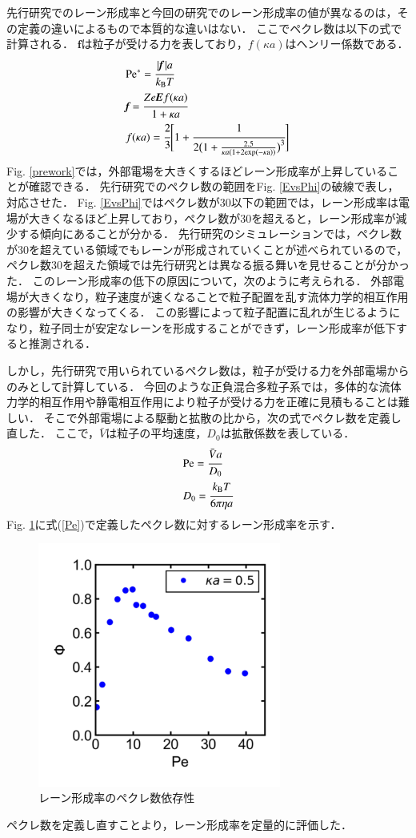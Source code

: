 先行研究でのレーン形成率と今回の研究でのレーン形成率の値が異なるのは，その定義の違いによるもので本質的な違いはない．
ここでペクレ数は以下の式で計算される．
$\boldsymbol{f}$は粒子が受ける力を表しており，$f(\kappa a)$はヘンリー係数である\cite{Henry}．
\begin{eqnarray}
	& \textrm{Pe}^* = \cfrac{|\textit{\textbf{f}}\,| a}{k_{\rm{B}} T}\\
	& \textit{\textbf{f}} = \cfrac{Ze\textit{\textbf{E}}f(\kappa a)}{1 + \kappa a}\\
	& f(\kappa a) = \cfrac{2}{3} \Biggl[1 + \cfrac{1}{2 \bigl(1 + \frac{2.5}{\kappa a (1 + 2 \rm{exp}(-\kappa a))}\bigl)^3}\Biggl]
\end{eqnarray}
Fig. \ref{prework}では，外部電場を大きくするほどレーン形成率が上昇していることが確認できる．
先行研究でのペクレ数の範囲をFig. \ref{EvsPhi}の破線で表し，対応させた．
Fig. \ref{EvsPhi}ではペクレ数が30以下の範囲では，レーン形成率は電場が大きくなるほど上昇しており，ペクレ数が30を超えると，レーン形成率が減少する傾向にあることが分かる．
先行研究のシミュレーションでは，ペクレ数が30を超えている領域でもレーンが形成されていくことが述べられているので，ペクレ数30を超えた領域では先行研究とは異なる振る舞いを見せることが分かった．
このレーン形成率の低下の原因について，次のように考えられる．
外部電場が大きくなり，粒子速度が速くなることで粒子配置を乱す流体力学的相互作用の影響が大きくなってくる．
この影響によって粒子配置に乱れが生じるようになり，粒子同士が安定なレーンを形成することができず，レーン形成率が低下すると推測される．

しかし，先行研究で用いられているペクレ数は，粒子が受ける力を外部電場からのみとして計算している．
今回のような正負混合多粒子系では，多体的な流体力学的相互作用や静電相互作用により粒子が受ける力を正確に見積もることは難しい．
そこで外部電場による駆動と拡散の比から，次の式でペクレ数を定義し直した．
ここで，$\bar{V}$は粒子の平均速度，$D_0$は拡散係数を表している．
\begin{eqnarray}
	& \textrm{Pe} = \cfrac{\bar{V}a}{D_0}  \label{Pe}\\
	& D_0 = \cfrac{k_{\rm{B}}T}{6 \pi \eta a}
\end{eqnarray}
%
Fig. \ref{PevsPhi}に式(\ref{Pe})で定義したペクレ数に対するレーン形成率を示す．

%
\begin{figure}[H]
\centering
\includegraphics[width=8.0cm]{figures/PevsPhi.pdf}
\caption{レーン形成率のペクレ数依存性}
\label{PevsPhi}
\end{figure}
\noindent
ペクレ数を定義し直すことより，レーン形成率を定量的に評価した．
%
